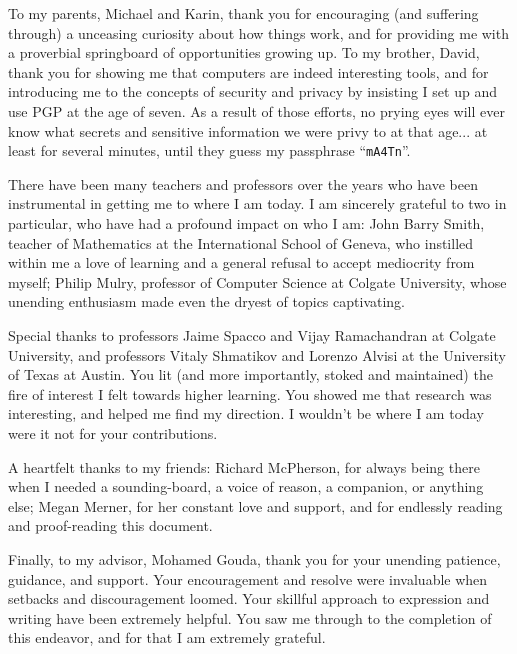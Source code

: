 To my parents, Michael and Karin, thank you for encouraging (and suffering through) a unceasing curiosity about how things work,
    and for providing me with a proverbial springboard of opportunities growing up.
To my brother, David, thank you for showing me that computers are indeed interesting tools,
    and for introducing me to the concepts of security and privacy by insisting I set up and use PGP at the age of seven.
As a result of those efforts, no prying eyes will ever know what secrets and sensitive information we were privy to at that age...
    at least for several minutes, until they guess my passphrase ``\texttt{mA4Tn}''.

There have been many teachers and professors over the years who have been instrumental in getting me to where I am today.
I am sincerely grateful to two in particular, who have had a profound impact on who I am:
    John Barry Smith, teacher of Mathematics at the International School of Geneva,
        who instilled within me a love of learning and a general refusal to accept mediocrity from myself;
    Philip Mulry, professor of Computer Science at Colgate University,
        whose unending enthusiasm made even the dryest of topics captivating.

Special thanks to professors Jaime Spacco and Vijay Ramachandran at Colgate University,
    and professors Vitaly Shmatikov and Lorenzo Alvisi at the University of Texas at Austin.
You lit (and more importantly, stoked and maintained) the fire of interest I felt towards higher learning.
You showed me that research was interesting, and helped me find my direction.
I wouldn't be where I am today were it not for your contributions.

A heartfelt thanks to my friends:
    Richard McPherson, for always being there when I needed a sounding-board, a voice of reason, a companion, or anything else;
    Megan Merner, for her constant love and support, and for endlessly reading and proof-reading this document.

Finally, to my advisor, Mohamed Gouda, thank you for your unending patience, guidance, and support.
Your encouragement and resolve were invaluable when setbacks and discouragement loomed.
Your skillful approach to expression and writing have been extremely helpful.
You saw me through to the completion of this endeavor, and for that I am extremely grateful.
